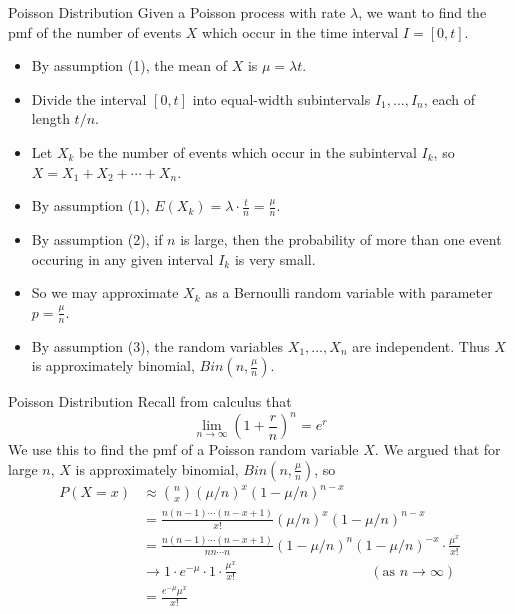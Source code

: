 \documentclass[]{beamer}
\begin{document}
    \begin{frame}{Poisson Distribution}
    Given a Poisson process with rate $\lambda$, we want to find the pmf of the number of events $X$ which occur in the time interval $I=[0,t]$.
    
    \pause \begin{itemize}
    \item By assumption (1), the mean of $X$ is $\mu=\lambda t$.
    \item Divide the interval $[0,t]$ into equal-width subintervals $I_1, \dots, I_n$, each of length $t/n$.
    \item Let $X_k$ be the number of events which occur in the subinterval $I_k$, so $X=X_1+X_2+\cdots+X_n$. 
    \item By assumption (1), $E(X_k)=\lambda\cdot \frac t n= \frac\mu n$. 
    \item By assumption (2), if $n$ is large, then the probability of more than one event occuring in any given interval $I_k$ is very small. 
    \item So we may approximate $X_k$ as a Bernoulli random variable with parameter $p=\frac{\mu}n$.
    \item By assumption (3), the random variables $X_1,\dots, X_n$ are independent. Thus $X$ is approximately binomial, $Bin(n,\frac \mu n)$.
    \end{itemize}
    \end{frame}
    
    \begin{frame}{Poisson Distribution}
    Recall from calculus that
    $$\lim_{n\to\infty} \left(1+\frac{r}n\right)^n = e^r$$
    We use this to find the pmf of a Poisson random variable $X$. We argued that for large $n$, $X$ is approximately binomial, $Bin(n,\frac{\mu}n)$, so
    \begin{align*}
    P(X=x) & \approx \binom{n}{x} (\mu/n)^x(1-\mu/n)^{n-x} \\
    &= \frac{n(n-1)\cdots(n-x+1)}{x!}(\mu/n)^x(1-\mu/n)^{n-x} \\
    &= \frac{n(n-1)\cdots(n-x+1)}{nn \cdots n}(1-\mu/n)^n(1-\mu/n)^{-x}\cdot \frac{\mu^x}{x!} \\
    &\to 1 \cdot e^{-\mu}\cdot 1\cdot \frac{\mu^x}{x!} \hspace{4cm} (\text{as }n\to\infty)\\
    &= \frac{e^{-\mu}\mu^x}{x!}
    \end{align*}
    \end{frame}
    
\end{document}
